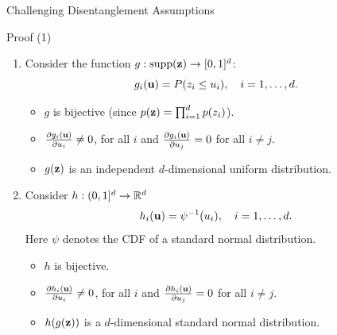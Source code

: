 \documentclass{beamer}
\begin{document}
\begin{frame}{Challenging Disentanglement Assumptions}
\begin{block}{Proof (1)}
	\begin{enumerate}
		\item 
		Consider the function $g: \text{supp}(\mathbf{z}) \rightarrow [0, 1]^d$:
		\vspace{-0.1cm}
		\[
		g_i(\mathbf{u}) = P(z_i \leq u_i), \quad i=1, \dots, d.
		\]
		\vspace{-0.4cm}
		\begin{itemize}
			\item $g$ is bijective (since $p(\mathbf{z}) = \prod_{i=1}^dp(z_i)$).
			\item $\frac{\partial g_i(\mathbf{u})}{\partial u_i} \neq 0$, for all $i$ and $\frac{\partial g_i(\mathbf{u})}{\partial u_j} = 0$ for all $i \neq j$.
			\item $g(\mathbf{z})$ is an independent $d$-dimensional uniform distribution.
		\end{itemize}
		\item 
		Consider $h: (0, 1]^d \rightarrow \mathbb{R}^d$
		\[
		h_i(\mathbf{u}) = \psi^{-1}(u_i), \quad i= 1, \dots, d.
		\]
		Here $\psi$  denotes the CDF of a standard normal distribution.
		\begin{itemize}
			\item $h$ is bijective.
			\item $\frac{\partial h_i(\mathbf{u})}{\partial u_i} \neq 0$, for all $i$ and $\frac{\partial h_i(\mathbf{u})}{\partial u_j} = 0$ for all $i \neq j$.
			\item $h(g(\mathbf{z}))$  is a $d$-dimensional standard normal distribution.
		\end{itemize}
	\end{enumerate}
\end{block}

\end{frame}
\end{document}
